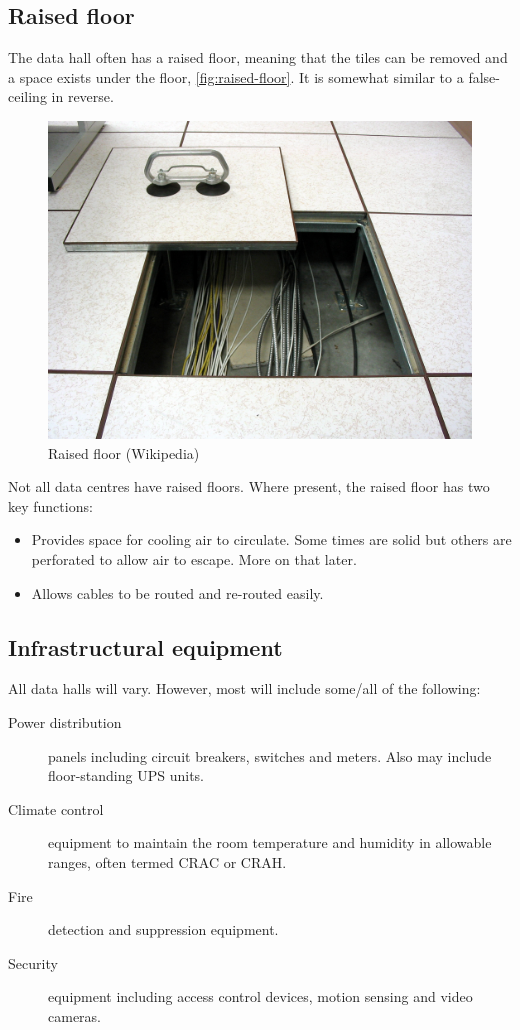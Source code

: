 \documentclass{pgnotes}
\begin{document}
\subsection{Raised floor}

The data hall often has a raised floor, meaning that the tiles can be removed and a space exists under the floor, \autoref{fig:raised-floor}.
It is somewhat similar to a false-ceiling in reverse.

\begin{figure}[htbp]
  \centering
  \includegraphics[width=0.75\linewidth]{raised_floor_wikipedia}
  \caption{Raised floor (Wikipedia)}
  \label{fig:raised-floor}
\end{figure}

Not all data centres have raised floors.
Where present, the raised floor has two key functions:
\begin{itemize}
\item Provides space for cooling air to circulate. Some times are solid but others are perforated to allow air to escape. More on that later.
\item Allows cables to be routed and re-routed easily. 
\end{itemize}

\subsection{Infrastructural equipment}

All data halls will vary.
However, most will include some/all of the following:
\begin{description}
\item[Power distribution] panels including circuit breakers, switches and meters. Also may include floor-standing UPS units.
\item[Climate control] equipment to maintain the room temperature and humidity in allowable ranges, often termed CRAC or CRAH.
\item[Fire] detection and suppression equipment.
\item[Security] equipment including access control devices, motion sensing and video cameras.
\end{description}
\end{document}
